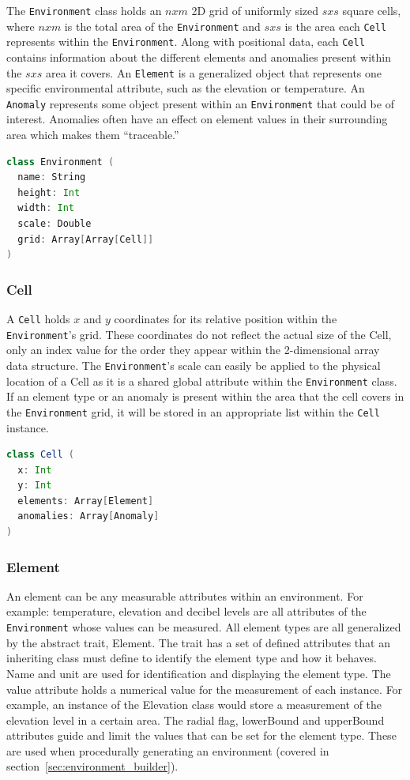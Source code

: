 The \texttt{Environment} class holds an $n x m$ 2D grid of uniformly sized $s x s$ square cells, where $n x m$ is the total area of the \texttt{Environment} and $s x s$ is the area each \texttt{Cell} represents within the \texttt{Environment}.
Along with positional data, each \texttt{Cell} contains information about the different elements and anomalies present within the $s x s$ area it covers.
An \texttt{Element} is a generalized object that represents one specific environmental attribute, such as the elevation or temperature.
An \texttt{Anomaly} represents some object present within an \texttt{Environment} that could be of interest.
Anomalies often have an effect on element values in their surrounding area which makes them ``traceable.''

\begin{lstlisting}[language=Scala]
class Environment (
  name: String
  height: Int
  width: Int
  scale: Double
  grid: Array[Array[Cell]]
)
\end{lstlisting}

\subsubsection{Cell} \label{subsec:cell}
A \texttt{Cell} holds $x$ and $y$ coordinates for its relative position within the \texttt{Environment}'s grid.
These coordinates do not reflect the actual size of the Cell, only an index value for the order they appear within the 2-dimensional array data structure.
The \texttt{Environment}'s scale can easily be applied to the physical location of a Cell as it is a shared global attribute within the \texttt{Environment} class.
If an element type or an anomaly is present within the area that the cell covers in the \texttt{Environment} grid, it will be stored in an appropriate list within the \texttt{Cell} instance.

\begin{lstlisting}[language=Scala]
class Cell (
  x: Int
  y: Int
  elements: Array[Element]
  anomalies: Array[Anomaly]
)
\end{lstlisting}

\subsubsection{Element} \label{subsec:element}
An element can be any measurable attributes within an environment.
For example: temperature, elevation and decibel levels are all attributes of the \texttt{Environment} whose values can be measured.
All element types are all generalized by the abstract trait, Element.
The trait has a set of defined attributes that an inheriting class must define to identify the element type and how it behaves.
Name and unit are used for identification and displaying the element type.
The value attribute holds a numerical value for the measurement of each instance.
For example, an instance of the Elevation class would store a measurement of the elevation level in a certain area.
The radial flag, lowerBound and upperBound attributes guide and limit the values that can be set for the element type.
These are used when procedurally generating an environment (covered in section~\ref{sec:environment_builder}).

